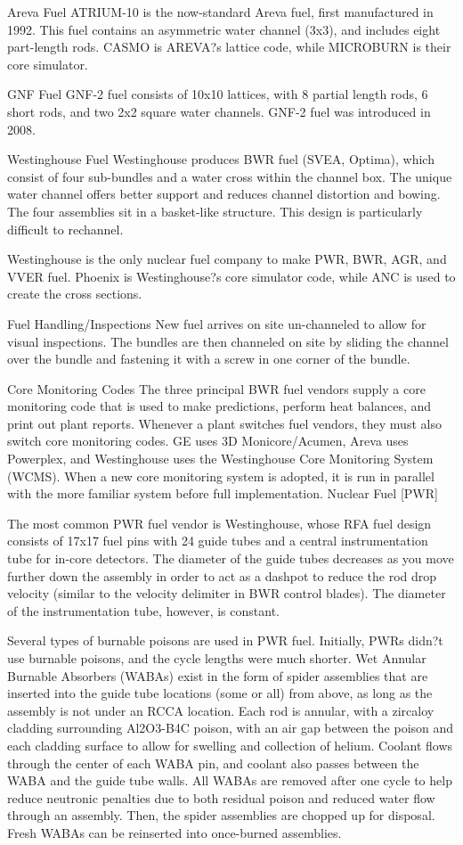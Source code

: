 \documentclass[10pt]{article}
\begin{document}
Areva Fuel
ATRIUM-10 is the now-standard Areva fuel, first manufactured in 1992. This fuel contains an asymmetric water channel (3x3), and includes eight part-length rods. CASMO is AREVA?s lattice code, while MICROBURN is their core simulator. 

GNF Fuel
GNF-2 fuel consists of 10x10 lattices, with 8 partial length rods, 6 short rods, and two 2x2 square water channels. GNF-2 fuel was introduced in 2008. 

Westinghouse Fuel
Westinghouse produces BWR fuel (SVEA, Optima), which consist of four sub-bundles and a water cross within the channel box. The unique water channel offers better support and reduces channel distortion and bowing. The four assemblies sit in a basket-like structure. This design is particularly difficult to rechannel. 

Westinghouse is the only nuclear fuel company to make PWR, BWR, AGR, and VVER fuel. Phoenix is Westinghouse?s core simulator code, while ANC is used to create the cross sections. 

Fuel Handling/Inspections
New fuel arrives on site un-channeled to allow for visual inspections. The bundles are then channeled on site by sliding the channel over the bundle and fastening it with a screw in one corner of the bundle. 

Core Monitoring Codes
The three principal BWR fuel vendors supply a core monitoring code that is used to make predictions, perform heat balances, and print out plant reports. Whenever a plant switches fuel vendors, they must also switch core monitoring codes. GE uses 3D Monicore/Acumen, Areva uses Powerplex, and Westinghouse uses the Westinghouse Core Monitoring System (WCMS). When a new core monitoring system is adopted, it is run in parallel with the more familiar system before full implementation. 
Nuclear Fuel [PWR]

The most common PWR fuel vendor is Westinghouse, whose RFA fuel design consists of 17x17 fuel pins with 24 guide tubes and a central instrumentation tube for in-core detectors. The diameter of the guide tubes decreases as you move further down the assembly in order to act as a dashpot to reduce the rod drop velocity (similar to the velocity delimiter in BWR control blades). The diameter of the instrumentation tube, however, is constant. 

Several types of burnable poisons are used in PWR fuel. Initially, PWRs didn?t use burnable poisons, and the cycle lengths were much shorter. Wet Annular Burnable Absorbers (WABAs) exist in the form of spider assemblies that are inserted into the guide tube locations (some or all) from above, as long as the assembly is not under an RCCA location. Each rod is annular, with a zircaloy cladding surrounding Al2O3-B4C poison, with an air gap between the poison and each cladding surface to allow for swelling and collection of helium. Coolant flows through the center of each WABA pin, and coolant also passes between the WABA and the guide tube walls. All WABAs are removed after one cycle to help reduce neutronic penalties due to both residual poison and reduced water flow through an assembly. Then, the spider assemblies are chopped up for disposal. Fresh WABAs can be reinserted into once-burned assemblies. 
\end{document}
